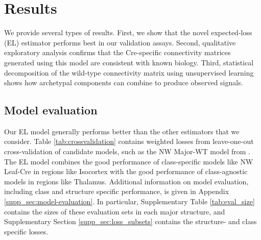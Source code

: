 \section{Results}
\label{sec:results}

We provide several types of results.
First, we show that the novel expected-loss (EL) estimator performs best in our validation assays.
Second, qualitative exploratory analysis confirms that the Cre-specific connectivity matrices generated using this model are consistent with known biology. 
Third, statistical decomposition of the wild-type connectivity matrix using unsupervised learning shows how archetypal components can combine to produce observed signals.

\subsection{Model evaluation}
\label{sec:model_eval}

Our EL model generally performs better than the other estimators that we consider.
Table \ref{tab:crossvalidation} contains weighted losses from leave-one-out cross-validation of candidate models, such as the NW Major-WT model from \citet{Knox2019-ot}.
The EL model combines the good performance of class-specific models like NW Leaf-Cre in regions like Isocortex with the good performance of class-agnostic models in regions like Thalamus.
Additional information on model evaluation, including class and structure specific performance, is given in Appendix \ref{supp_sec:model-evaluation}.
In particular, Supplementary Table \ref{tab:eval_size} contains the sizes of these evaluation sets in each major structure, and Supplementary Section \ref{supp_sec:loss_subsets} contains the structure- and class specific losses.

